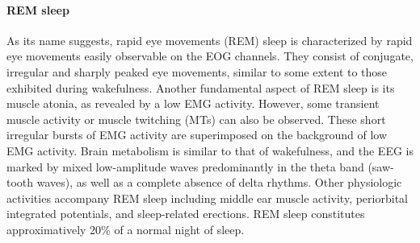 \paragraph{REM sleep}
As its name suggests, rapid eye movements (REM) sleep is characterized by rapid eye movements easily observable on the EOG channels. They consist of conjugate, irregular and sharply peaked eye movements, similar to some extent to those exhibited during wakefulness. Another fundamental aspect of REM sleep is its muscle atonia, as revealed by a low EMG activity. However, some transient muscle activity or muscle twitching (MTs) can also be observed. These short irregular bursts of EMG activity are superimposed on the background of low EMG activity. Brain metabolism is similar to that of wakefulness, and the EEG is marked by mixed low-amplitude waves predominantly in the theta band (saw-tooth waves), as well as a complete absence of delta rhythms. Other physiologic activities accompany REM sleep including middle ear muscle activity, periorbital integrated potentials, and sleep-related erections. REM sleep constitutes approximatively 20\% of a normal night of sleep.


